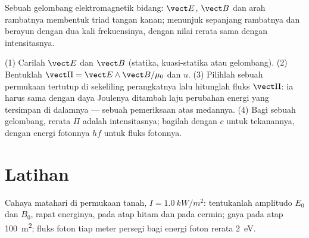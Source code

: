 \begin{omfigure}

{\small Sebuah gelombang elektromagnetik bidang: $\vect E$, $\vect B$ dan
arah rambatnya membentuk triad tangan kanan; 
menunjuk sepanjang rambatnya dan berayun dengan dua kali
frekuensinya, dengan nilai rerata sama dengan intensitasnya.}
\end{omfigure}

\begin{method}\label{met:b2:poynting-vector:method}
(1) Carilah $\vect E$ dan $\vect B$ (statika, kuasi-statika atau gelombang). (2)
Bentuklah $\vect\Pi = \vect E\wedge\vect B/\mu_0$ dan $u$. (3) Pilihlah sebuah permukaan
tertutup di sekeliling perangkatnya lalu hitunglah fluks $\vect\Pi$: ia harus
sama dengan daya Joulenya ditambah laju perubahan energi yang tersimpan
di dalamnya --- sebuah pemeriksaan atas medannya. (4) Bagi sebuah gelombang, rerata $\Pi$ adalah
intensitasnya; bagilah dengan $c$ untuk tekanannya, dengan energi fotonnya
$hf$ untuk fluks fotonnya.
\end{method}

\section{Latihan}

\begin{exercise}[$\star$]\label{exo:b2:poynting-vector:1}
Cahaya matahari di permukaan tanah, $I = \qty{1.0}{kW/m^2}$: tentukanlah amplitudo $E_0$ dan $B_0$,
rapat energinya,  pada atap hitam dan pada cermin;
gaya pada atap \qty{100}{m^2}; fluks foton tiap meter persegi bagi
energi foton rerata \qty{2}{eV}.
\end{exercise}

